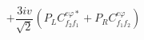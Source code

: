 %
\begin{dmath*}
%
  +  \frac{3 i v}{\sqrt{2}} \left(P_L C^{e \varphi  *}_{f_2 f_1} + P_R C^{e \varphi  }_{f_1 f_2}\right)
%
\end{dmath*}
%
